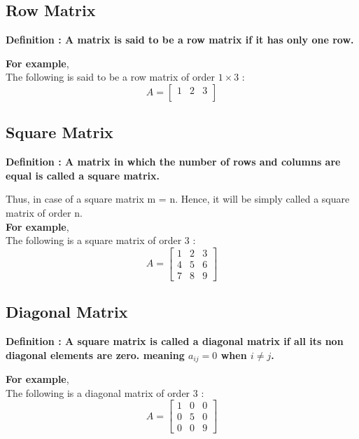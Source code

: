 \documentclass[12pt, letterpaper]{article}
\begin{document}
\subsection{Row Matrix}
\begin{displayquote}
\textbf{Definition : A matrix is said to be a row matrix if it has only one row.}
\end{displayquote}
\textbf{For example},\\
The following is said to be a row matrix of order $1 \times 3$ : 
\begin{displaymath}
A = \begin{bmatrix}
1 & 2 & 3\\
\end{bmatrix}
\end{displaymath}

\subsection{Square Matrix}
 \begin{displayquote}
\textbf{Definition : A matrix in which the number of rows and columns are equal is called a square matrix.}
\end{displayquote}
Thus, in case of a square matrix m = n. Hence, it will be simply called a square matrix of order n.\\
\textbf{For example},\\
The following is a square matrix of order 3 : 
 \begin{displaymath}
 A = \begin{bmatrix}
1 & 2 & 3 \\
4 & 5 & 6 \\
7 & 8 & 9
\end{bmatrix}
 \end{displaymath}

\subsection{Diagonal Matrix}
\begin{displayquote}
\textbf{Definition : A square matrix is called a diagonal matrix if all its non diagonal elements are zero. meaning $a_{ij} = 0$ when $i \neq j$.}
\end{displayquote}
\textbf{For example},\\
The following is a diagonal matrix of order 3 : 
\begin{displaymath}
A = \begin{bmatrix}
1 & 0 & 0 \\
0 & 5 & 0 \\
0 & 0 & 9
\end{bmatrix}
\end{displaymath}
\end{document}
